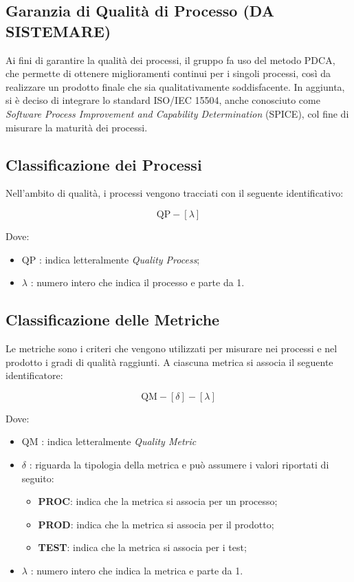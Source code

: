 \subsection{Garanzia di Qualità di Processo (DA SISTEMARE)}

Ai fini di garantire la qualità dei processi, il gruppo fa uso del metodo PDCA, che permette di ottenere miglioramenti continui per i singoli processi, così da realizzare un prodotto finale che sia qualitativamente soddisfacente. In aggiunta, si è deciso di integrare lo standard ISO/IEC 15504, anche conosciuto come \textit{Software Process Improvement and Capability Determination} (SPICE), col fine di misurare la maturità dei processi.

\subsection{Classificazione dei Processi}

Nell'ambito di qualità, i processi vengono tracciati con il seguente identificativo:

\[
		\text{QP}-[\lambda]
\]

Dove: 

\begin{itemize}
	\item QP : indica letteralmente \textit{Quality Process};
	\item \(\lambda\) : numero intero che indica il processo e parte da 1.
\end{itemize}

\subsection{Classificazione delle Metriche}

Le metriche sono i criteri che vengono utilizzati per misurare nei processi e nel prodotto i gradi di qualità raggiunti. A ciascuna metrica si associa il seguente identificatore:

\[
		\text{QM}-[\delta]-[\lambda]
\]

Dove: 

\begin{itemize}
	\item QM : indica letteralmente \textit{Quality Metric}
	\item \(\delta\) : riguarda la tipologia della metrica e può assumere i valori riportati di seguito:
		\begin{itemize}
			\item \textbf{PROC}: indica che la metrica si associa per un processo;
			\item \textbf{PROD}: indica che la metrica si associa per il prodotto;
			\item \textbf{TEST}: indica che la metrica si associa per i test;
		\end{itemize}
	\item \(\lambda\) : numero intero che indica la metrica e parte da 1.
\end{itemize}

